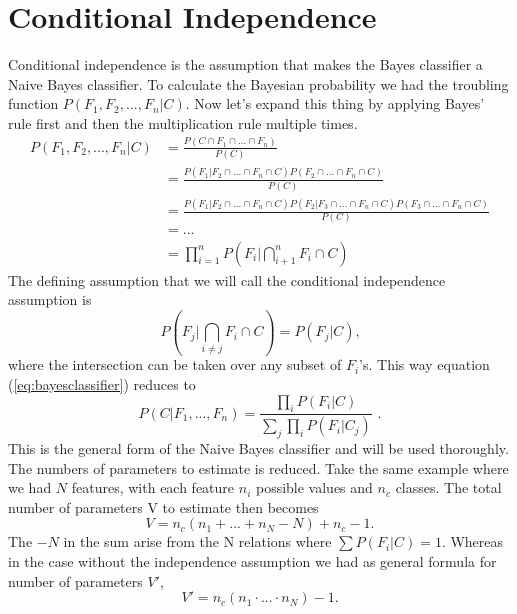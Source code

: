 \documentclass{report}
\theoremstyle{definition}
\begin{document}
\section{Conditional Independence} \label{sec:conditionalindependence}
Conditional independence is the assumption that makes the Bayes classifier a Naive Bayes classifier. To calculate the Bayesian probability we had the troubling function $P(F_1,F_2,...,F_n|C)$. Now let's expand this thing by applying Bayes' rule first and then the multiplication rule multiple times.
\begin{equation*}
\begin{split}
P(F_1,F_2,...,F_n|C)&=\frac{P(C \cap F_1 \cap ... \cap F_n)}{P(C)}\\
&=\frac{P(F_1|F_2 \cap ... \cap F_n \cap C)P(F_2\cap ...\cap F_n \cap C)}{P(C)}\\
&=\frac{P(F_1|F_2 \cap ...\cap F_n \cap C)P(F_2|F_3 \cap ...\cap F_n \cap C)P(F_3 \cap ... \cap F_n \cap C)}{P(C)}\\
&=...\\
&=\prod_{i=1}^{n}{P(F_i|\bigcap_{i+1}^{n}{F_i}\cap C)}
\end{split}
\end{equation*}
The defining assumption that we will call the conditional independence assumption is
\begin{equation}
P(F_j|\bigcap_{i \not= j}^{}{F_i}\cap C)=P(F_j|C)\text{,}
\end{equation}
where the intersection can be taken over any subset of $F_i$'s. This way equation (\ref{eq:bayesclassifier}) reduces to
\begin{equation} \label{eq:genbayes}
P(C|F_1,...,F_n)=\frac{\prod\limits_{i}^{}P(F_i|C)}{\sum\limits_{j}^{}\prod\limits_{i}^{}P(F_i|C_j)} \text{ .}
\end{equation}
This is the general form of the Naive Bayes classifier and will be used thoroughly. The numbers of parameters to estimate is reduced. Take the same example where we had $N$ features, with each feature $n_i$ possible values and $n_c$ classes. The total number of parameters V to estimate then becomes 
\begin{equation}
V=n_c(n_1 + ... + n_N - N)+n_c-1.
\end{equation}
The $-N$ in the sum arise from the N relations where $\sum P(F_i|C)=1$. Whereas in the case without the independence assumption we had as general formula for number of parameters $V'$,
\begin{equation}
V'=n_c(n_1 \cdot ... \cdot n_N)-1.
\end{equation}
\end{document}
